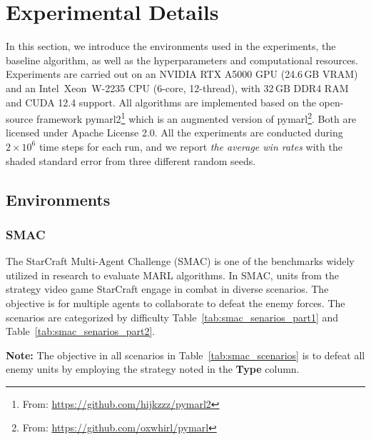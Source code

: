 \section{Experimental Details}
In this section, we introduce the environments used in the experiments, the baseline algorithm, as well as the hyperparameters and computational resources. Experiments are carried out on an NVIDIA RTX A5000 GPU (24.6\,GB VRAM) and an Intel\textregistered\ Xeon\textregistered\ W-2235 CPU (6-core, 12-thread), with 32\,$\mathrm{GB}$ DDR4 RAM and CUDA 12.4 support. All algorithms are implemented based on the open-source framework pymarl2\footnote{From: \url{https://github.com/hijkzzz/pymarl2}}  \parencite{pymarl2} which is an augmented version of pymarl\footnote{From: \url{https://github.com/oxwhirl/pymarl}}. Both are licensed under Apache License 2.0. 
 All the experiments are conducted during $2 \times 10^6$ time steps for each run, and we report \textit{the average win rates} with the shaded standard error from three different random seeds.

\subsection{Environments}
\subsubsection{SMAC}

The StarCraft Multi-Agent Challenge (SMAC) \parencite{smac} is one of the benchmarks widely utilized in research to evaluate MARL algorithms. In SMAC, units from the strategy video game StarCraft  engage in combat in diverse scenarios. The objective is for multiple agents to collaborate to defeat the enemy forces. The scenarios are categorized by difficulty  Table~\ref{tab:smac_senarios_part1} and Table~\ref{tab:smac_senarios_part2}.

\noindent\textbf{Note:} The objective in all scenarios in Table~\ref{tab:smac_scenarios} is to defeat all enemy units by employing the strategy noted in the \textbf{Type} column.


